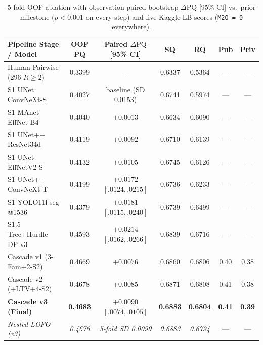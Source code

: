 \documentclass[sigconf]{acmart}
\begin{document}
\begin{table}[t]
\centering
\caption{5-fold OOF ablation with observation-paired bootstrap $\Delta\mathrm{PQ}$ [95\% CI] vs.\ prior milestone ($p<0.001$ on every step) and live Kaggle LB scores (\texttt{M2O = 0} everywhere).}
\label{tab:ablation}
\scriptsize
\setlength{\tabcolsep}{2.2pt}
\begin{tabular}{@{}lcccccc@{}}
\toprule
\textbf{Pipeline Stage / Model} & \textbf{OOF PQ} & \textbf{Paired $\Delta\mathrm{PQ}$ [95\% CI]} & \textbf{SQ} & \textbf{RQ} & \textbf{Pub} & \textbf{Priv} \\
\midrule
Human Pairwise (296 $R{\ge}2$) & 0.3399 & --- & 0.6337 & 0.5364 & --- & --- \\
\midrule
S1 UNet ConvNeXt-S & 0.4027 & baseline (SD 0.0153) & 0.6741 & 0.5974 & --- & --- \\
S1 MAnet EffNet-B4 & 0.4040 & $+0.0013$ & 0.6634 & 0.6090 & --- & --- \\
S1 UNet++ ResNet34d & 0.4119 & $+0.0092$ & 0.6710 & 0.6139 & --- & --- \\
S1 UNet EffNetV2-S & 0.4132 & $+0.0105$ & 0.6745 & 0.6126 & --- & --- \\
S1 UNet++ ConvNeXt-T & 0.4199 & $+0.0172$ $[.0124,.0215]$ & 0.6736 & 0.6233 & --- & --- \\
S1 YOLO11l-seg @1536 & 0.4379 & $+0.0181$ $[.0115,.0240]$ & 0.6739 & 0.6499 & --- & --- \\
\midrule
S1.5 Tree+Hurdle DP v3 & 0.4593 & $+0.0214$ $[.0162,.0266]$ & 0.6839 & 0.6716 & --- & --- \\
Cascade v1 (3-Fam+2-S2) & 0.4669 & $+0.0076$ & 0.6860 & 0.6806 & 0.40 & 0.38 \\
Cascade v2 (+LTV+4-S2) & 0.4678 & $+0.0085$ & 0.6871 & 0.6808 & 0.41 & 0.38 \\
\textbf{Cascade v3 (Final)} & \textbf{0.4683} & $\mathbf{+0.0090}$ $[.0074,.0105]$ & \textbf{0.6883} & \textbf{0.6804} & \textbf{0.41} & \textbf{0.39} \\
\quad \textit{Nested LOFO (v3)} & \textit{0.4676} & \textit{5-fold SD 0.0099} & \textit{0.6883} & \textit{0.6794} & --- & --- \\
\bottomrule
\end{tabular}
\end{table}
\end{document}
